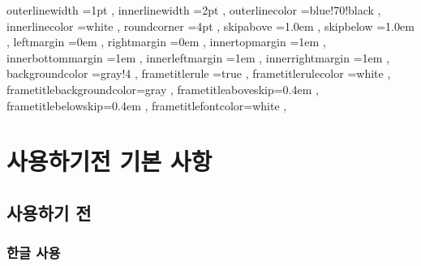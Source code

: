 \documentclass[12pt, a4paper, oneside]{book}
\let\stdsection\section
\renewcommand\section{\newpage\stdsection}
\begin{document}
		\newpage
		\singlespace
		\tableofcontents
		\doublespace
		
		\newpage
		\listoffigures
		
		\newpage
		\listoftables


			





		 {
						outerlinewidth		=1pt			,%
						innerlinewidth		=2pt			,%
						outerlinecolor		=blue!70!black	,%
						innerlinecolor		=white 			,%
						roundcorner			=4pt			,%
						skipabove			=1.0em 			,%
						skipbelow			=1.0em 			,%
						leftmargin			=0em			,%
						rightmargin			=0em			,%
						innertopmargin		=1em 			,%
						innerbottommargin 	=1em 			,%
						innerleftmargin		=1em 			,%
						innerrightmargin	=1em 			,%
						backgroundcolor		=gray!4			,%
						frametitlerule		=true 			,%
						frametitlerulecolor	=white			,%
						frametitlebackgroundcolor=gray		,%
						frametitleaboveskip=0.4em 			,%
						frametitlebelowskip=0.4em 			,%
						frametitlefontcolor=white 			,%
						}




	 {\protect\newpage}
	\part{사용하기전 기본 사항}

			\parttoc
				
	




	\chapter{사용하기 전 }
	\minitoc				%


	\clearpage
	\section{한글 사용}
\end{document}
